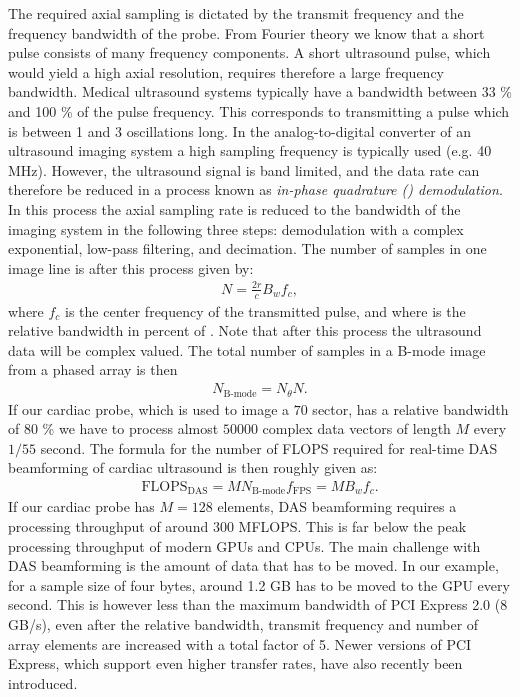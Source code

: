 The required axial sampling is dictated by the transmit frequency and the frequency bandwidth of the probe. From Fourier theory we know that a short pulse consists of many frequency components. A short ultrasound pulse, which would yield a high axial resolution, requires therefore a large frequency bandwidth. Medical ultrasound systems typically have a bandwidth between 33 \% and 100 \% of the pulse frequency. This corresponds to transmitting a pulse which is between 1 and 3 oscillations long. In the analog-to-digital converter of an ultrasound imaging system a high sampling frequency is typically used (e.g. 40 MHz). However, the ultrasound signal is band limited, and the data rate can therefore be reduced in a process known as \textit{in-phase quadrature () demodulation}. In this process the axial sampling rate is reduced to the bandwidth of the imaging system in the following three steps: demodulation with a complex exponential, low-pass filtering, and decimation. The number of samples in one image line is after this process given by:
\begin{align}
N = \frac{2r}{c}B_wf_c,
\end{align}
where $f_c$ is the center frequency of the transmitted pulse, and where  is the relative bandwidth in percent of . Note that after this process the ultrasound data will be complex valued. The total number of samples in a B-mode image from a phased array is then 
\begin{align}
N_{\text{B-mode}} = N_\theta N.
\end{align}
If our cardiac probe, which is used to image a $70$\degree{} sector, has a relative bandwidth of $80$ \% we have to process almost $50000$ complex data vectors of length $M$ every $1/55$ second. The formula for the number of FLOPS required for real-time DAS beamforming of cardiac ultrasound is then roughly given as:
\begin{align}
\text{FLOPS}_{\text{DAS}} = MN_{\text{B-mode}}f_{\text{FPS}} = MB_wf_c.
\end{align}
If our cardiac probe has $M=128$ elements, DAS beamforming requires a processing throughput of around $300$ MFLOPS. This is far below the peak processing throughput of modern GPUs and CPUs. The main challenge with DAS beamforming is the amount of data that has to be moved. In our example, for a sample size of four bytes, around 1.2 GB has to be moved to the GPU every second. This is however less than the maximum bandwidth of PCI Express 2.0 (8 GB/s), even after the relative bandwidth, transmit frequency and number of array elements are increased with a total factor of 5. Newer versions of PCI Express, which support even higher transfer rates, have also recently been introduced.

